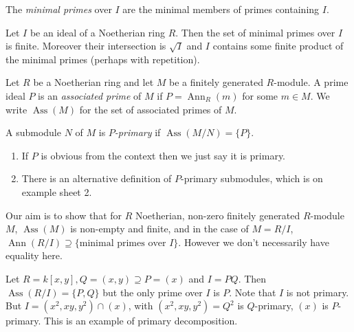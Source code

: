 \documentclass[a4paper]{article}
\DeclareMathOperator{\Ann}{Ann} %
\DeclareMathOperator{\Ass}{Ass} %
\begin{document}
\begin{definition}
  The \emph{minimal primes} over \(I\) are the minimal members of primes containing \(I\).
\end{definition}

\begin{lemma}
  Let \(I\) be an ideal of a Noetherian ring \(R\). Then the set of minimal primes over \(I\) is finite. Moreover their intersection is \(\sqrt I\) and \(I\) contains some finite product of the minimal primes (perhaps with repetition).
\end{lemma}

\begin{definition}
  Let \(R\) be a Noetherian ring and let \(M\) be a finitely generated \(R\)-module. A prime ideal \(P\) is an \emph{associated prime} of \(M\) if \(P = \Ann_R(m)\) for some \(m \in M\). We write \(\Ass(M)\) for the set of associated primes of \(M\).
\end{definition}

\begin{definition}
  A submodule \(N\) of \(M\) is \emph{\(P\)-primary} if \(\Ass(M/N) = \{P\}\).
\end{definition}

\begin{remark}\leavevmode
  \begin{enumerate}
  \item If \(P\) is obvious from the context then we just say it is primary.
  \item There is an alternative definition of \(P\)-primary submodules, which is on example sheet 2.
  \end{enumerate}
\end{remark}

Our aim is to show that for \(R\) Noetherian, non-zero finitely generated \(R\)-module \(M\), \(\Ass(M)\) is non-empty and finite, and in the case of \(M = R/I\), \(\Ann(R/I) \supseteq \{\text{minimal primes over } I\}\). However we don't necessarily have equality here.

\begin{eg}
  Let \(R = k[x, y], Q = (x, y) \supseteq P = (x)\) and \(I = PQ\). Then \(\Ass(R/I) = \{P, Q\}\) but the only prime over \(I\) is \(P\). Note that \(I\) is not primary. But \(I = (x^2, xy, y^2) \cap (x)\), with \((x^2, xy, y^2) = Q^2\) is \(Q\)-primary, \((x)\) is \(P\)-primary. This is an example of primary decomposition.
\end{eg}
\end{document}
